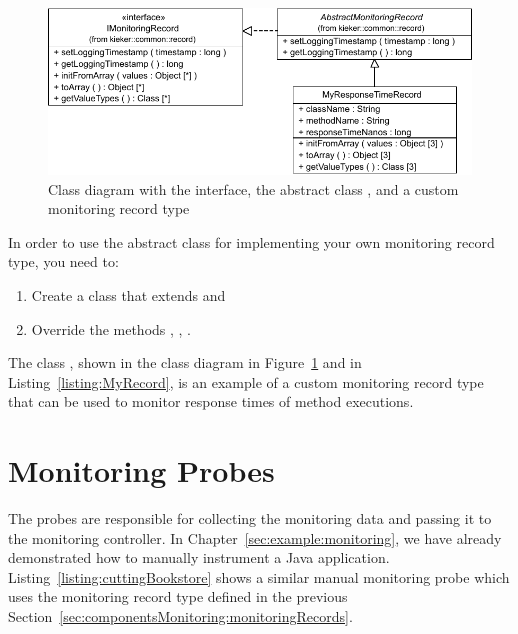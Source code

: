 \begin{figure}[h]\centering
\includegraphics[scale=0.7]{images/kieker_MyRTRecord-modified}
\caption{Class diagram with the  interface, the abstract %
class , and a custom monitoring record type %
}
\label{sec:monitoringrecord:interfacesAndImplementingClasses}
\end{figure}

\pagebreak

\noindent In order to use the abstract class for implementing your own monitoring record type, you need to:

\begin{enumerate}
\item Create a class that extends   and
\item Override the methods , , .
\end{enumerate}

\noindent The class , shown in the class diagram in %
Figure~\ref{sec:monitoringrecord:interfacesAndImplementingClasses} and in %
Listing~\ref{listing:MyRecord}, is an example of a custom monitoring record type %
that can be used to monitor response times of method executions.

\setJavaCodeListing


\pagebreak

\section{Monitoring Probes}\label{sec:monitoring:probe}

The probes are responsible for collecting the monitoring data and passing it %
to the monitoring controller. %
In Chapter~\ref{sec:example:monitoring}, we have already demonstrated how to %
manually instrument a Java application. Listing~\ref{listing:cuttingBookstore} %
shows a similar manual monitoring probe which uses the monitoring record type %
 defined in the previous Section~\ref{sec:componentsMonitoring:monitoringRecords}.

